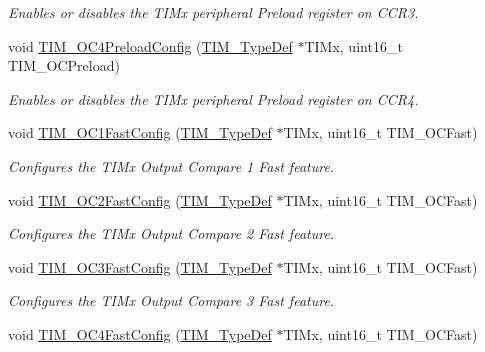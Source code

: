 \begin{DoxyCompactItemize}
\begin{DoxyCompactList}\small\item\em Enables or disables the T\+I\+Mx peripheral Preload register on C\+C\+R3. \end{DoxyCompactList}\item 
void \mbox{\hyperlink{group___t_i_m___exported___functions_ga8bf4dfb35ff0c7b494dd96579f50b1ec}{T\+I\+M\+\_\+\+O\+C4\+Preload\+Config}} (\mbox{\hyperlink{struct_t_i_m___type_def}{T\+I\+M\+\_\+\+Type\+Def}} $\ast$T\+I\+Mx, uint16\+\_\+t T\+I\+M\+\_\+\+O\+C\+Preload)
\begin{DoxyCompactList}\small\item\em Enables or disables the T\+I\+Mx peripheral Preload register on C\+C\+R4. \end{DoxyCompactList}\item 
void \mbox{\hyperlink{group___t_i_m___exported___functions_gaec82031ca62f31f5483195c09752a83a}{T\+I\+M\+\_\+\+O\+C1\+Fast\+Config}} (\mbox{\hyperlink{struct_t_i_m___type_def}{T\+I\+M\+\_\+\+Type\+Def}} $\ast$T\+I\+Mx, uint16\+\_\+t T\+I\+M\+\_\+\+O\+C\+Fast)
\begin{DoxyCompactList}\small\item\em Configures the T\+I\+Mx Output Compare 1 Fast feature. \end{DoxyCompactList}\item 
void \mbox{\hyperlink{group___t_i_m___exported___functions_ga413359c87f46c69f1ffe2dc8fb3a65e7}{T\+I\+M\+\_\+\+O\+C2\+Fast\+Config}} (\mbox{\hyperlink{struct_t_i_m___type_def}{T\+I\+M\+\_\+\+Type\+Def}} $\ast$T\+I\+Mx, uint16\+\_\+t T\+I\+M\+\_\+\+O\+C\+Fast)
\begin{DoxyCompactList}\small\item\em Configures the T\+I\+Mx Output Compare 2 Fast feature. \end{DoxyCompactList}\item 
void \mbox{\hyperlink{group___t_i_m___exported___functions_gab2f3698e6e56bd9b0a4be7056ba789e1}{T\+I\+M\+\_\+\+O\+C3\+Fast\+Config}} (\mbox{\hyperlink{struct_t_i_m___type_def}{T\+I\+M\+\_\+\+Type\+Def}} $\ast$T\+I\+Mx, uint16\+\_\+t T\+I\+M\+\_\+\+O\+C\+Fast)
\begin{DoxyCompactList}\small\item\em Configures the T\+I\+Mx Output Compare 3 Fast feature. \end{DoxyCompactList}\item 
void \mbox{\hyperlink{group___t_i_m___exported___functions_ga58279a04e8ea5333f1079d3cce8dde12}{T\+I\+M\+\_\+\+O\+C4\+Fast\+Config}} (\mbox{\hyperlink{struct_t_i_m___type_def}{T\+I\+M\+\_\+\+Type\+Def}} $\ast$T\+I\+Mx, uint16\+\_\+t T\+I\+M\+\_\+\+O\+C\+Fast)

\end{DoxyCompactItemize}
